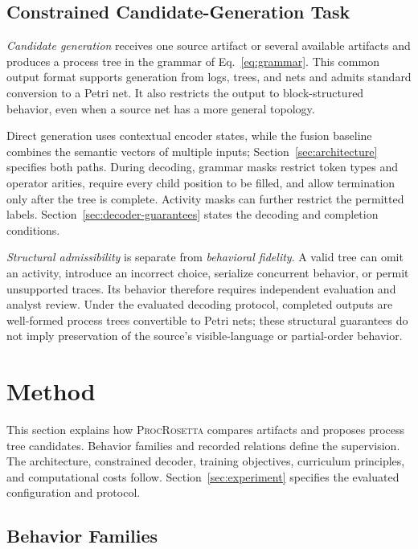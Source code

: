 \documentclass[mathematics,article,submit,moreauthors]{Definitions/mdpi}
\newcommand{\model}{\textsc{ProcRosetta}\xspace}
\begin{document}
\subsection{Constrained Candidate-Generation Task}

\emph{Candidate generation} receives one source artifact or several available artifacts and produces a process tree in the grammar of Eq.~\eqref{eq:grammar}. This common output format supports generation from logs, trees, and nets and admits standard conversion to a Petri net. It also restricts the output to block-structured behavior, even when a source net has a more general topology.

Direct generation uses contextual encoder states, while the fusion baseline combines the semantic vectors of multiple inputs; Section~\ref{sec:architecture} specifies both paths. During decoding, grammar masks restrict token types and operator arities, require every child position to be filled, and allow termination only after the tree is complete. Activity masks can further restrict the permitted labels. Section~\ref{sec:decoder-guarantees} states the decoding and completion conditions.

\emph{Structural admissibility} is separate from \emph{behavioral fidelity}. A valid tree can omit an activity, introduce an incorrect choice, serialize concurrent behavior, or permit unsupported traces. Its behavior therefore requires independent evaluation and analyst review. Under the evaluated decoding protocol, completed outputs are well-formed process trees convertible to Petri nets; these structural guarantees do not imply preservation of the source's visible-language or partial-order behavior.

\FloatBarrier
\section{Method}\label{sec:model}

This section explains how \model compares artifacts and proposes process tree candidates. Behavior families and recorded relations define the supervision. The architecture, constrained decoder, training objectives, curriculum principles, and computational costs follow. Section~\ref{sec:experiment} specifies the evaluated configuration and protocol.

\subsection{Behavior Families}\label{sec:corpus}
\end{document}
